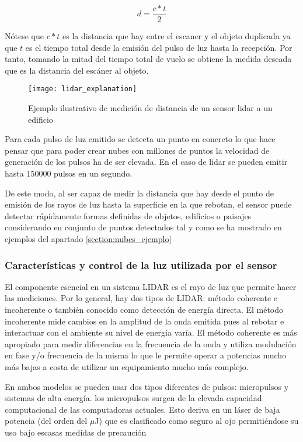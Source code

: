 $$d = \frac{c*t}{2}$$

Nótese que $c*t$ es la distancia que hay entre el escaner y el objeto duplicada ya que $t$ es el tiempo total desde la emisión del pulso de luz hasta la recepción. Por tanto, tomando la mitad del tiempo total de vuelo se obtiene la medida deseada que es la distancia del escáner al objeto.

\begin{figure}
\centering
{}
  \texttt{[image: lidar\_explanation]}
  \caption{Ejemplo ilustrativo de medición de distancia de un sensor lidar a un edificio}\label{fig:lidar explanation}
\endminipage\hfill

\end{figure}

Para cada pulso de luz emitido se detecta un punto en concreto lo que hace pensar que para poder crear nubes con millones de puntos la velocidad de generación de los pulsos ha de ser elevada. En el caso de lidar se pueden emitir hasta 150000 pulsos en un segundo.

De este modo, al ser capaz de medir la distancia que hay desde el punto de emisión de los rayos de luz hasta la superficie en la que rebotan, el sensor puede detectar rápidamente formas definidas de objetos, edificios o paisajes considerando en conjunto de puntos detectados tal y como se ha mostrado en ejemplos del apartado \ref{section:nubes_ejemplo}

\subsubsection{Características y control de la luz utilizada por el sensor}
El componente esencial en un sistema LIDAR es el rayo de luz que permite hacer las mediciones. Por lo general, hay dos tipos de LIDAR:
método coherente e incoherente o también conocido como detección de energía directa.
El método incoherente mide cambios en la amplitud de la onda emitida pues al rebotar e interactuar con el ambiente su nivel de energía varía.
El método coherente es más apropiado para medir diferencias en la frecuencia de la onda y utiliza modulación en fase y/o frecuencia de la misma lo que le permite operar a potencias mucho más bajas a costa de utilizar un equipamiento mucho más complejo.


En ambos modelos se pueden usar dos tipos diferentes de pulsos: micropulsos y sistemas de alta energía.
los micropulsos surgen de la elevada capacidad computacional de las computadoras actuales. Esto deriva en un láser de baja potencia (del orden del $\mu$J) que es clasificado como seguro al ojo permitiéndose su uso bajo escasas medidas de precaución 

